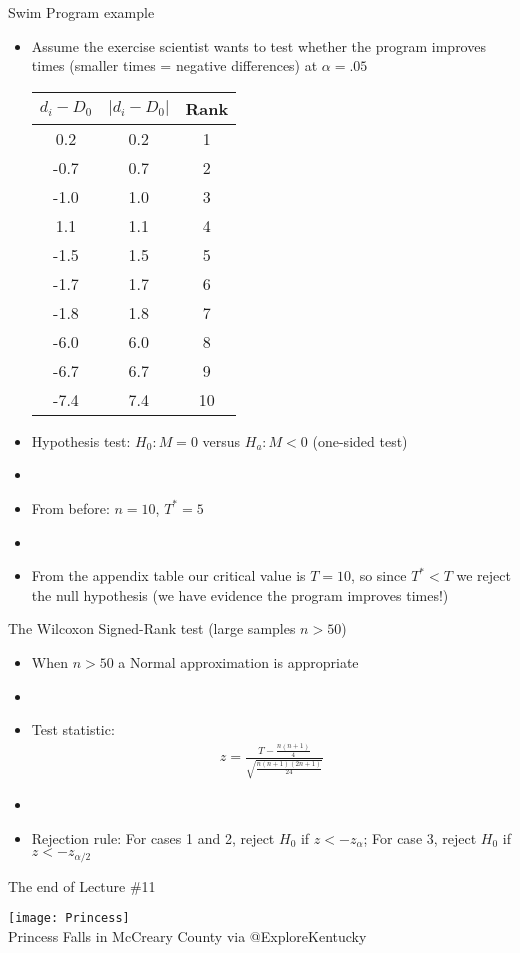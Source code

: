 \documentclass[xcolor=dvipsnames]{beamer}
\begin{document}
\begin{frame}{Swim Program example}
	\begin{itemize}
		\item Assume the exercise scientist wants to test whether the program improves times (smaller times = negative differences) at $\alpha = .05$ \pause
		{\tiny
			\begin{center}
				\begin{tabular}{|c|c|c|}
					\hline
					$d_i -D_0$ & \textbf{$|d_i - D_0|$} &  \textbf{Rank}  \\ \hline \hline
					0.2 & 0.2 &     1\\ \hline
					-0.7  &0.7  &    2\\ \hline
					-1.0  &1.0  &    3\\ \hline
					1.1  & 1.1  &    4\\ \hline
					-1.5  & 1.5  &    5\\ \hline
					-1.7  &1.7  &    6\\ \hline
					-1.8  & 1.8  &    7\\ \hline
					-6.0  & 6.0  &    8\\ \hline
					-6.7  & 6.7  &    9\\ \hline
					-7.4  &7.4  &   10\\ \hline
				\end{tabular}
		\end{center}} \pause
	\item Hypothesis test: $H_0: M = 0$ versus  $H_a: M < 0$ (one-sided test) \pause
	\item[]
	\item From before: $n = 10$, $T^* = 5$ \pause
	\item[] 
	\item From the appendix table our critical value is $T = 10$, so since $T^* < T$ we reject the null hypothesis (we have evidence the program improves times!)
	\end{itemize}
\end{frame}

\begin{frame}{The Wilcoxon Signed-Rank test (large samples $n > 50$)}
	\begin{itemize}
		\item When $n >50$ a Normal approximation is appropriate \pause
		\item[]
		\item Test statistic:
		\begin{gather*}
			z = \frac{T-\frac{n(n+1)}{4}}{\sqrt{\frac{n(n+1)(2n+1)}{24}}}
		\end{gather*}
		\item[]
		\item Rejection rule: For cases 1 and 2, reject $H_0$ if $z<-z_{\alpha}$; For case 3, reject $H_0$ if $z < -z_{\alpha/2}$
	\end{itemize}
\end{frame}

\begin{frame}{The end of Lecture \#11}
	\begin{center}
		\texttt{[image: Princess]} \\
		{\tiny Princess Falls in McCreary County via @ExploreKentucky}
	\end{center}
\end{frame}
\end{document}
